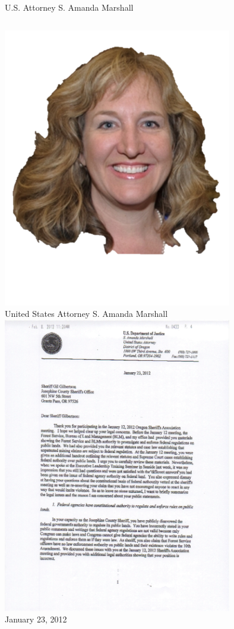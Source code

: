 \begin{frame}{U.S. Attorney S. Amanda Marshall}
    \begin{columns}[onlytextwidth]
            \centering
            \includegraphics[width=0.75\textwidth]{img/amanda-marshall.png} \\
            United States Attorney S. Amanda Marshall \\

            \centering
            \includegraphics[width=0.75\textwidth]{img/marshall-letter.png} \\
            January 23, 2012 \\
    \end{columns}
\end{frame}

